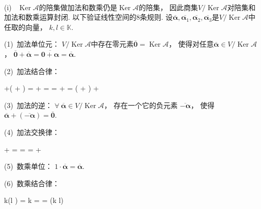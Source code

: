 \smallskip
\begin{pf}~

    (i)~
    $\operatorname{Ker}\mathcal{A}$的陪集做加法和数乘仍是$\operatorname{Ker}\mathcal{A}$的陪集，
    因此商集$V / \operatorname{Ker}\mathcal{A}$对陪集和加法和数乘运算封闭.
    以下验证线性空间的$8$条规则.
    设$\overline{\bm{\alpha}} , \overline{\bm{\alpha}_1} , \overline{\bm{\alpha}_2} , \overline{\bm{\alpha}_3}$是$V / \operatorname{Ker}\mathcal{A}$中任取的向量，
    $k,l \in \mathbb{K}$.

    \medskip

    (1)~加法单位元：
    $V / \operatorname{Ker}\mathcal{A}$中存在零元素$\overline{\bm{0}} = \operatorname{Ker}\mathcal{A}$，
    使得对任意$\overline{\bm{\alpha}} \in V / \operatorname{Ker}\mathcal{A}$，
    $\overline{\bm{0}} + \overline{\bm{\alpha}} = \overline{\bm{0} + \bm{\alpha}} = \overline{\bm{\alpha}}$. 

    (2)~加法结合律：
    \begin{eq1}
         +(  + ) 
        =  + 
        = 
        =  + 
        = ( + ) + 
    \end{eq1}

    (3)~加法的逆：
    $\forall ~\overline{\bm{\alpha}}\in V / \operatorname{Ker}\mathcal{A}$，
    存在一个它的负元素
    $\overline{-\bm{\alpha}}$，
    使得$\overline{\bm{\alpha}}+(\overline{-\bm{\alpha}}) = \overline{\bm{0}}$.

    (4)~加法交换律：
    \begin{eq1}
         +  
        = 
        = 
        =  + 
    \end{eq1}
    
    (5)~数乘单位：
    $1 \cdot \overline{\bm{\alpha}} = \overline{\bm{\alpha}}$.

    (6)~数乘结合律：
    \begin{eq1}
        k(l \overline{\bm{\alpha}}) 
        = k 
        = 
        = (k l)\overline{\bm{\alpha}}
    \end{eq1}


\end{pf}
